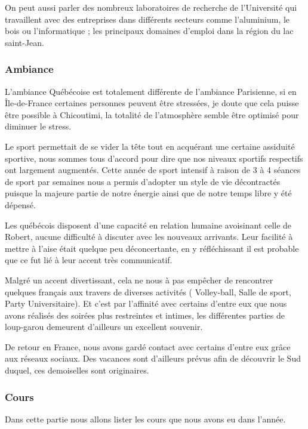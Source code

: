 On peut aussi parler des nombreux laboratoires de recherche de l’Université qui travaillent avec des entreprises dans différents secteurs comme l’aluminium, le bois ou l’informatique ; les principaux domaines d’emploi dans la région du lac saint-Jean.

\subsubsection{Ambiance}

L'ambiance Québécoise est totalement différente de l'ambiance Parisienne, si en Île-de-France certaines personnes peuvent être stressées, je doute que cela puisse être possible à Chicoutimi, la totalité de l'atmosphère semble être optimisé pour diminuer le stress.

Le sport permettait de se vider la tête tout en acquérant une certaine assiduité sportive, nous sommes tous d'accord pour dire que nos niveaux sportifs respectifs ont largement augmentés. Cette année de sport intensif à raison de 3 à 4 séances de sport par semaines nous a permis d'adopter un style de vie décontractés puisque la majeure partie de notre énergie ainsi que de notre temps libre y été dépensé.

Les québécois disposent d'une capacité en relation humaine avoisinant celle de Robert, aucune difficulté à discuter avec les nouveaux arrivants. Leur facilité à mettre à l'aise était quelque peu déconcertante, en y réfléchissant il est probable que ce fut lié à leur accent très communicatif. 

Malgré un accent divertissant, cela ne nous à pas empêcher de rencontrer quelques français aux travers de diverses activités ( Volley-ball, Salle de sport, Party Universitaire). Et c'est par l'affinité avec certains d'entre eux que nous avons réalisés des soirées plus restreintes et intimes, les différentes parties de loup-garou demeurent d'ailleurs un excellent souvenir. 

De retour en France, nous avons gardé contact avec certains d'entre eux grâce aux réseaux sociaux. Des vacances sont d'ailleurs prévus afin de découvrir le Sud duquel, ces demoiselles sont originaires.

 


\subsubsection{Cours}
Dans cette partie nous allons lister les cours que nous avons eu dans l'année.\\

